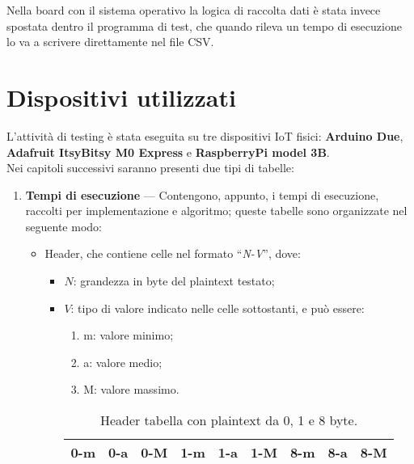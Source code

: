 \noindent Nella board con il sistema operativo la logica di raccolta dati è stata invece spostata dentro il programma di test, che quando rileva un tempo di esecuzione lo va a scrivere direttamente nel file CSV.

\newpage

\section{Dispositivi utilizzati}

L'attività di testing è stata eseguita su tre dispositivi IoT fisici: \textbf{Arduino Due}, \textbf{Adafruit ItsyBitsy M0 Express} e \textbf{RaspberryPi model 3B}. \\

\noindent Nei capitoli successivi saranno presenti due tipi di tabelle:
\begin{enumerate}[label=\Roman*.]
    \item \textbf{Tempi di esecuzione} --- Contengono, appunto, i tempi di esecuzione, raccolti per implementazione e algoritmo; queste tabelle sono organizzate nel seguente modo:
    \begin{itemize}
        \item Header, che contiene celle nel formato ``\textit{N-V}'', dove:
        \begin{itemize}
            \item $N$: grandezza in byte del plaintext testato;
            \item $V$: tipo di valore indicato nelle celle sottostanti, e può essere:
            \begin{enumerate}[label=(\arabic*)]
                \item m: valore minimo;
                \item a: valore medio;
                \item M: valore massimo.
            \end{enumerate}
            \begin{table}[H]
                \centering
            	\begin{tabular}{|c|c|c|c|c|c|c|c|c|}
            		\hline
            		0-m & 0-a & 0-M & 1-m & 1-a & 1-M & 8-m & 8-a & 8-M \\
            		\hline
                \end{tabular}
                \caption{Header tabella con plaintext da 0, 1 e 8 byte.}
            \end{table}
        \end{itemize}

\end{itemize}
\end{enumerate}
